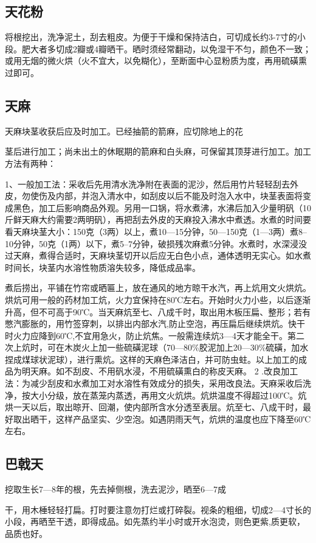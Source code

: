 \documentclass{ctexbook}
\begin{document}
\subsection{天花粉}
将根挖出，洗净泥土，刮去粗皮。为便于干燥和保持洁白，可切成长约3-7寸的小段。肥大者多切成2瓣或4瓣晒干。晒时须经常翻动，以免湿干不匀，颜色不一致；或用无烟的微火烘（火不宜大，以免糊化），至断面中心显粉质为度，再用硫磺熏过即可。
\subsection{天麻}
天麻块茎收获后应及时加工。已经抽箭的箭麻，应切除地上的花

茎后进行加工；尚未出土的休眠期的箭麻和白头麻，可保留其顶芽进行加工。加工方法有两种：

1、一般加工法：采收后先用清水洗净附在表面的泥沙，然后用竹片轻轻刮去外皮，勿使伤及内部，并泡入清水中，如刮皮以后不能及时泡入水中，块茎表面将变成黑色，加工后影响商品外观。另用一口锅，将水煮沸，水沸后加入少量明矾（10斤鲜天麻大约需要2两明矾），再把刮去外皮的天麻投入沸水中煮透。水煮的时间要看天麻块茎大小：150克（3两）以上，煮10—15分钟，50—150克（1—3两）煮8--10分钟，50克（1两）以下，煮5--7分钟，破损残次麻煮5分钟。水煮时，水深浸没过天麻，煮得合适时，天麻块茎切开以后应无白色小点，通体透明无实心。如水煮时间长，块茎内水溶性物质溶失较多，降低成品率。

煮后捞出，平铺在竹帘或晒匾上，放在通风的地方晾干水汽，再上炕用文火烘炕。烘炕可用一般的药材加工炕，火力宜保持在80℃左右。开始时火力小些，以后逐渐升高，但不可高于90℃。当天麻炕至七、八成千时，取出用木板压扁、整形；若有憋汽膨胀的，用竹签穿刺，以排出内部水汽,防止空泡，再压扁后继续烘炕。快干时火力应降到60℃,不宜用急火，防止炕焦。一般需连续炕3—4天才能全干。第二次上炕时，可在木炭火上加一些硫磺泥球（70—80\%胶泥加上20—30\%硫磺，加水捏成煤球状泥球），进行熏炕。这样的天麻色泽洁白，并可防虫蛀。以上加工的成品为明天麻。如不刮皮、不用矾水浸，不用硫磺熏白的称皮天麻。
2	.改良加工法：为减少刮皮和水煮加工对水溶性有效成分的损失，采用改良法。天麻采收后洗净，按大小分级，放在蒸笼内蒸透，再用文火炕烘。炕烘温度不得超过100℃。炕烘一天以后，取出晾开、回潮，使内部所含水分透至表层。炕至七、八成干时，最好取出晒干，这样产品坚实、少空泡。如遇阴雨天气，炕烘的温度也应下降至60℃左右。
\subsection{巴戟天}
挖取生长7—8年的根，先去掉侧根，洗去泥沙，晒至6—7成

干，用木棰轻轻打扁。打时要注意勿打烂或打碎裂。视条的粗细，切成2—4寸长的小段，再晒至干透，即得成品。如先蒸约半小时或开水泡烫，则色更紫,质更软，品质也好。
\end{document}
